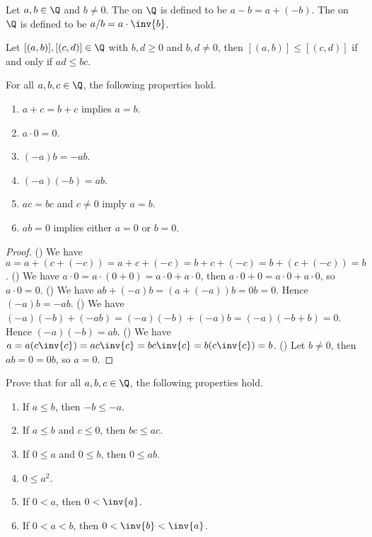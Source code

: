 \documentclass[10pt]{article}
\begin{document}
\begin{definition}
    Let $a,b\in\Q$ and $b\ne 0$. The  on $\Q$ is defined to be $a-b=a+(-b)$. The  on $\Q$ is defined to be $a/b=a\cdot\inv{b}$.
\end{definition}
\par
Let $[(a,b)],[(c,d)]\in\Q$ with $b,d\ge 0$ and $b,d\ne 0$, then $[(a,b)]\le[(c,d)]$ if and only if $ad\le bc$.
\begin{proposition}
    For all $a,b,c\in\Q$, the following properties hold.
    \begin{enumerate}
        \item $a+c=b+c$ implies $a=b$.
        \item $a\cdot 0=0$.
        \item $(-a)b=-ab$.
        \item $(-a)(-b)=ab$.
        \item $ac=bc$ and $c\ne 0$ imply $a=b$.
        \item $ab=0$ implies either $a=0$ or $b=0$.
    \end{enumerate}
\end{proposition}
\begin{proof}
    () We have $a=a+(c+(-c))=a+c+(-c)=b+c+(-c)=b+(c+(-c))=b$. () We have $a\cdot 0=a\cdot(0+0)=a\cdot 0+a\cdot 0$, then $a\cdot 0+0=a\cdot 0+a\cdot 0$, so $a\cdot 0=0$. () We have $ab+(-a)b=(a+(-a))b=0b=0$. Hence $(-a)b=-ab$. () We have $(-a)(-b)+(-ab)=(-a)(-b)+(-a)b=(-a)(-b+b)=0$. Hence $(-a)(-b)=ab$. () We have $a=a(c\inv{c})=ac\inv{c}=bc\inv{c}=b(c\inv{c})=b$. () Let $b\ne 0$, then $ab=0=0b$, so $a=0$. 
\end{proof}
\begin{problem}
    Prove that for all $a,b,c\in\Q$, the following properties hold.
    \begin{enumerate}
        \item If $a\le b$, then $-b\le -a$.
        \item If $a\le b$ and $c\le 0$, then $bc\le ac$.
        \item If $0\le a$ and $0\le b$, then $0\le ab$.
        \item $0\le{a}^{2}$.
        \item If $0<a$, then $0<\inv{a}$.
        \item If $0<a<b$, then $0<\inv{b}<\inv{a}$.
    \end{enumerate}
\end{problem}
\par
\end{document}
